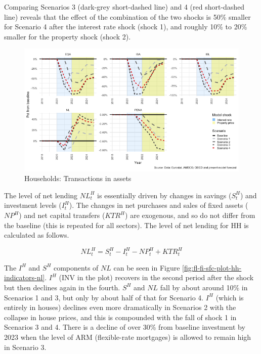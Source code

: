 \documentclass[
]{book}
\begin{document}
Comparing Scenarios 3 (dark-grey short-dashed line) and 4 (red short-dashed line) reveals that the effect of the combination of the two shocks is 50\% smaller for Scenario 4 after the interest rate shock (shock 1), and roughly 10\% to 20\% smaller for the property shock (shock 2).

\begin{figure}[H]
\includegraphics[width=0.95\linewidth]{figures/fl-fi-sfc-plot-hh-indicators-ibatr-1} \caption{Households: Transactions in assets}\label{fig:fl-fi-sfc-plot-hh-indicators-ibatr}
\end{figure}

The level of net lending \(NL^H_t\) is essentially driven by changes in savings (\(S^H_t\)) and investment levels (\(I^H_t\)). The changes in net purchases and sales of fixed assets (\(NP^H\)) and net capital transfers (\(KTR^H\)) are exogenous, and so do not differ from the baseline (this is repeated for all sectors). The level of net lending for HH is calculated as follows.

\begin{equation}
NL^H_t = S^H_t - I^H_t - NP^H_t + KTR^H_t
\end{equation}

The \(I^H\) and \(S^H\) components of \(NL\) can be seen in Figure \ref{fig:fl-fi-sfc-plot-hh-indicators-nl}. \(I^H\) (INV in the plot) recovers in the second period after the shock but then declines again in the fourth. \(S^H\) and \(NL\) fall by about around 10\% in Scenarios 1 and 3, but only by about half of that for Scenario 4. \(I^H\) (which is entirely in houses) declines even more dramatically in Scenarios 2 with the collapse in house prices, and this is compounded with the fall of shock 1 in Scenarios 3 and 4. There is a decline of over 30\% from baseline investment by 2023 when the level of ARM (flexible-rate mortgages) is allowed to remain high in Scenario 3.
\end{document}
